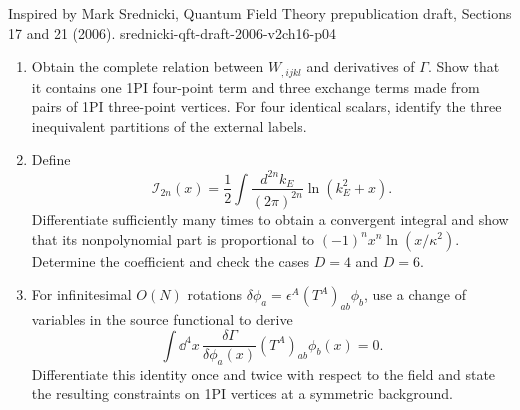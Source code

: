\begin{enumerate}
  {Inspired by Mark Srednicki, Quantum Field Theory prepublication draft, Sections 17 and 21 (2006).}
  {srednicki-qft-draft-2006-v2ch16-p04}
  \begin{enumerate}
    \item[(a)]
    Obtain the complete relation between \(W_{,ijkl}\) and derivatives of
    \(\Gamma\).  Show that it contains one 1PI four-point term and three
    exchange terms made from pairs of 1PI three-point vertices.  For four
    identical scalars, identify the three inequivalent partitions of the
    external labels.
    \item[(b)]
    Define
    \[
      \mathcal I_{2n}(x)
        =\frac12\int\frac{d^{2n}k_E}{(2\pi)^{2n}}\ln(k_E^2+x).
    \]
    Differentiate sufficiently many times to obtain a convergent integral
    and show that its nonpolynomial part is proportional to
    \((-1)^n x^n\ln(x/\kappa^2)\).  Determine the coefficient and check the
    cases \(D=4\) and \(D=6\).
    \item[(c)]
    For infinitesimal \(O(N)\) rotations
    \(\delta\phi_a=\epsilon^A(T^A)_{ab}\phi_b\), use a change of variables in
    the source functional to derive
    \[
      \int \dd^4x\,\frac{\delta\Gamma}{\delta\phi_a(x)}
        (T^A)_{ab}\phi_b(x)=0.
    \]
    Differentiate this identity once and twice with respect to the field and
    state the resulting constraints on 1PI vertices at a symmetric
    background.
  \end{enumerate}


\end{enumerate}
